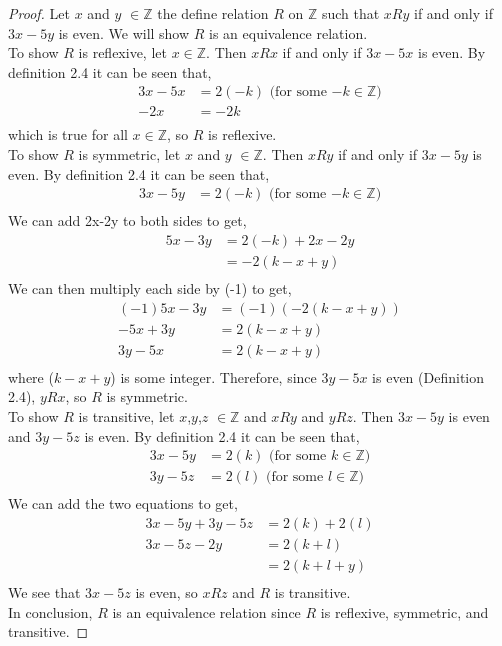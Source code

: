 \documentclass[12pt]{article}
\begin{document}
	\begin{proof}
	Let $x$ and $y$ $\in \mathbb{Z}$ the define relation $R$ on $\mathbb{Z}$ such that $xRy$ if and only if $3x-5y$ is even. We will show $R$ is an equivalence relation.\\

	To show $R$ is reflexive, let $x \in \mathbb{Z}$. Then $xRx$ if and only if $3x-5x$ is even. By definition 2.4 it can be seen that,
	\begin{align*}
		3x-5x &= 2(-k) \text{ (for some $-k \in \mathbb{Z}$)}\\
		-2x &= -2k\\
	\end{align*}
	which is true for all $x \in \mathbb{Z}$, so $R$ is reflexive.\\

	To show $R$ is symmetric, let $x$ and $y$ $\in \mathbb{Z}$. Then $xRy$ if and only if $3x-5y$ is even. By definition 2.4 it can be seen that,
	\begin{align*}
		3x-5y &= 2(-k) \text{ (for some $-k \in \mathbb{Z}$)}\\
	\end{align*}
	We can add 2x-2y to both sides to get,
	\begin{align*}
		5x-3y &= 2(-k) + 2x-2y\\
		      &= -2(k-x+y)\\
	\end{align*}
	We can then multiply each side by (-1) to get,
	\begin{align*}
		(-1)5x-3y &= (-1)(-2(k-x+y))\\
		-5x+3y&= 2(k-x+y)\\
		3y-5x &= 2(k-x+y)\\
	\end{align*}
	where ($k-x+y$) is some integer. Therefore, since $3y-5x$ is even (Definition 2.4), $yRx$, so
	$R$ is symmetric.\\

	To show $R$ is transitive, let $x$,$y$,$z$ $\in \mathbb{Z}$ and $xRy$ and $yRz$. 
	Then $3x-5y$ is even and $3y-5z$ is even. By definition 2.4 it can be seen that,
	\begin{align*}
		3x-5y &= 2(k) \text{ (for some $k \in \mathbb{Z}$)}\\
		3y-5z &= 2(l) \text{ (for some $l \in \mathbb{Z}$)}\\
	\end{align*}
	We can add the two equations to get,
	\begin{align*}
		3x-5y + 3y-5z &= 2(k) + 2(l)\\
		3x-5z - 2y &= 2(k+l)\\
			   &= 2(k+l+y)\\
	\end{align*}
	We see that $3x-5z$ is even, so $xRz$ and $R$ is transitive.\\

	In conclusion, $R$ is an equivalence relation since $R$ is reflexive, symmetric, and transitive.
\end{proof}
	
\end{document}
